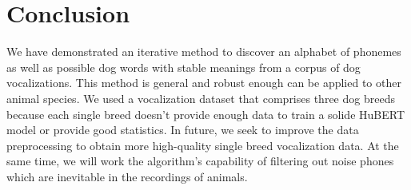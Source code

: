 \section{Conclusion}
We have demonstrated an iterative method to discover an alphabet of phonemes 
as well as possible dog words with stable meanings from a corpus of dog vocalizations. This method is general and robust enough can be applied to 
other animal species. We used a vocalization dataset that comprises three
dog breeds because each single breed doesn't provide enough data to train a
solide HuBERT model or provide good statistics. In future, we seek to improve 
the data preprocessing to obtain more high-quality single breed vocalization
data. At the same time, we will work the algorithm's capability of filtering
out noise phones which are inevitable in the recordings of animals.

